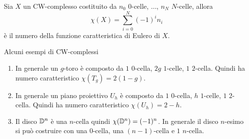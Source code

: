 \begin{definition}
	Sia $X$ un CW-complesso costituito da $n_0$ $0$-celle, $\dots$, $n_N$ $N$-celle, allora 
	\begin{equation*}
		\chi(X) = \sum_{i=0}^{N} (-1)^i n_i
	\end{equation*}
	è il numero della funzione caratteristica di Eulero di $X$. 
\end{definition}

\begin{remark}
	Alcuni esempi di CW-complessi
	\begin{enumerate}
		\item In generale un $g$-toro è composto da $1$ $0$-cella, $2g$ $1$-celle, $1$ $2$-cella. Quindi ha numero caratteristico $\chi(T_g) = 2(1-g)$. 
		\item In generale un piano proiettivo $U_h$ è composto da $1$ $0$-cella, $h$ $1$-celle, $1$ $2$-cella. Quindi ha numero caratteristico $\chi(U_h) = 2 - h$.
		\item Il disco $\mathbb{D}^n$ è una $n$-cella quindi $\chi(\mathbb{D}^n) = (-1)^n$. In generale il disco $n$-esimo si può costruire con una $0$-cella, una $(n-1)$-cella e $1$ $n$-cella.
	\end{enumerate}
\end{remark}

